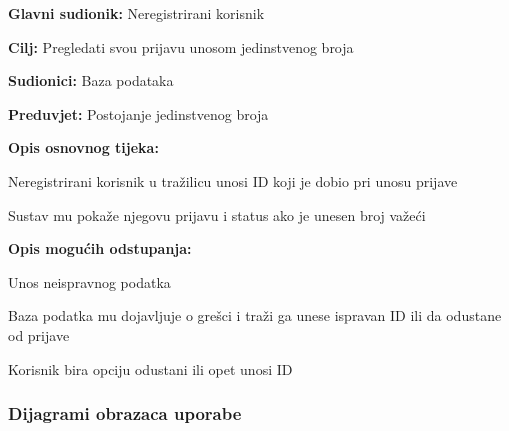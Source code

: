 					\noindent {}
					\begin{packed_item}
	
						\item \textbf{Glavni sudionik: }Neregistrirani korisnik
						\item  \textbf{Cilj:} Pregledati svou prijavu unosom jedinstvenog broja
						\item  \textbf{Sudionici:} Baza podataka
						\item  \textbf{Preduvjet:} Postojanje jedinstvenog broja
						\item  \textbf{Opis osnovnog tijeka:}
						
						\item[] \begin{packed_enum}
	
							\item Neregistrirani korisnik u tražilicu unosi ID koji je dobio pri unosu prijave
							\item Sustav mu pokaže njegovu prijavu i status ako je unesen broj važeći
						\end{packed_enum}
						\item  \textbf{Opis mogućih odstupanja:}
						
						\item[] \begin{packed_item}
	
							\item[1.a] Unos neispravnog podatka
							\item[] \begin{packed_enum}
								
								\item Baza podatka mu dojavljuje o grešci i traži ga unese ispravan ID ili da odustane od prijave
								\item Korisnik bira opciju odustani ili opet unosi ID	
							\end{packed_enum}
						\end{packed_item}
						
					\end{packed_item}
						
				
					
				\subsubsection{Dijagrami obrazaca uporabe}
					
